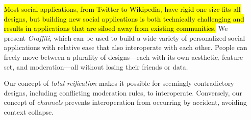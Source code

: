 




{\hl{%
Most social applications, from Twitter to Wikipedia,
have rigid one-size-fits-all designs, but building new social applications
is both technically challenging and results in
applications that are siloed away from existing communities.
}}%
We present \emph{Graffiti}, which can be used
to build a wide variety of personalized social applications
with relative ease that also interoperate with each other. People can freely move between
a plurality of designs---each with its own aesthetic, feature set,
and moderation---all without losing their friends or data.

Our concept of \emph{total reification} makes it possible
for seemingly contradictory designs, including conflicting
moderation rules, to interoperate.
Conversely, our concept of \emph{channels}
prevents interoperation from occurring by accident, avoiding context collapse.


